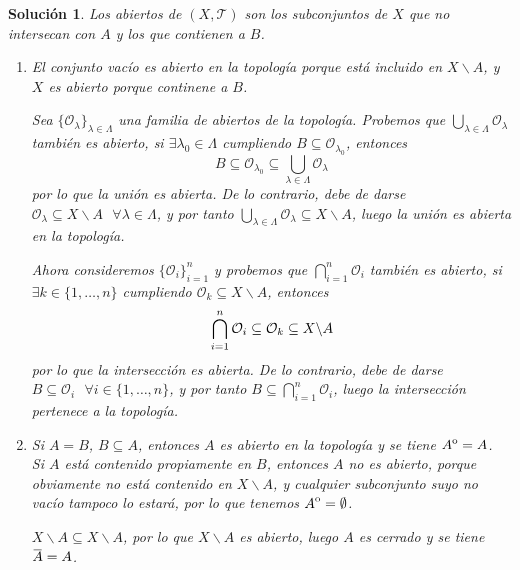 \documentclass{article}
\newcommand{\closure}[1]{\mkern
  1.5mu\overline{\mkern-1.5mu#1\mkern-1.5mu}\mkern 1.5mu}
\newcommand{\interior}[1]{{\kern0pt#1}^{\mathrm{o}}}
\theoremstyle{remark,bold} \newtheorem{exercise}{Ejercicio}
\newtheorem*{solution}{Solución}
\begin{document}
\begin{solution}

  Los abiertos de $(X, \mathcal{T})$ son los subconjuntos de $X$ que
  no intersecan con $A$ y los que contienen a $B$.

  \begin{enumerate}
    
  \item El conjunto vacío es abierto en la topología porque está
    incluido en $X \backslash A$, y $X$ es abierto porque continene a $B$.

    Sea $\{\mathcal{O}_\lambda\}_{\lambda \in \Lambda}$ una familia de
    abiertos de la topología. Probemos que $\bigcup\limits_{\lambda \in
      \Lambda}\mathcal{O}_\lambda$ también es abierto, si $\exists \lambda_0
    \in \Lambda$ cumpliendo $B \subseteq \mathcal{O}_{\lambda_0}$,
    entonces
    \[B \subseteq \mathcal{O}_{\lambda_0} \subseteq
      \bigcup\limits_{\lambda \in \Lambda}\mathcal{O}_\lambda\] por lo
    que la unión es abierta. De lo contrario, debe de darse
    $\mathcal{O}_\lambda \subseteq X \backslash A \text{ } \forall
    \lambda \in \Lambda$, y por tanto
    $\bigcup\limits_{\lambda \in \Lambda}\mathcal{O}_\lambda \subseteq
    X \backslash A$, luego la unión es abierta en la topología.

    Ahora consideremos $\{\mathcal{O}_i\}_{i=1}^n$ y probemos que
    $\bigcap\limits_{i=1}^n\mathcal{O}_i$ también es abierto, si $\exists
    k \in \{1, \ldots, n\}$ cumpliendo $\mathcal{O}_k \subseteq X
    \backslash A$, entonces
    \[\bigcap\limits_{i=1}^n\mathcal{O}_i \subseteq \mathcal{O}_k
      \subseteq X \backslash A \vspace{2mm}\] por lo que la intersección es
    abierta. De lo contrario, debe de darse $B \subseteq \mathcal{O}_i
    \text{ } \forall i \in \{1, \ldots, n\}$, y por tanto $B \subseteq
    \bigcap\limits_{i=1}^n\mathcal{O}_i$, luego la intersección pertenece
    a la topología. \vspace{2mm}

  \item Si $A = B$, $B \subseteq A$, entonces $A$ es abierto en la
    topología y se tiene $\interior{A} = A$. \\ Si $A$ está contenido
    propiamente en $B$, entonces $A$ no es abierto, porque obviamente no
    está contenido en $X \backslash A$, y cualquier subconjunto suyo no
    vacío tampoco lo estará, por lo que tenemos $\interior{A} =
    \emptyset$.
    
    $X \backslash A \subseteq X \backslash A$, por lo que $X
    \backslash A$ es abierto, luego $A$ es cerrado y se tiene $\closure{A}
    = A$.
    

\end{enumerate}
\end{solution}
\end{document}
